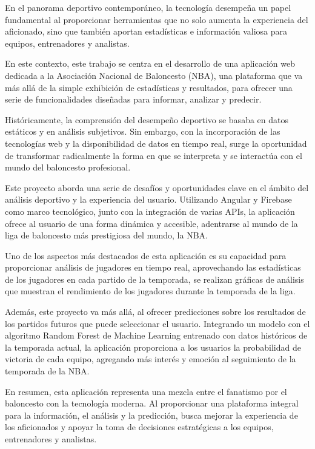 
En el panorama deportivo contemporáneo, la tecnología desempeña un papel fundamental al proporcionar herramientas que no solo aumenta la experiencia del aficionado, sino que también aportan estadísticas e información valiosa para equipos, entrenadores y analistas.

En este contexto, este trabajo se centra en el desarrollo de una aplicación web dedicada a la Asociación Nacional de Baloncesto (NBA), una plataforma que va más allá de la simple exhibición de estadísticas y resultados, para ofrecer una serie de funcionalidades diseñadas para informar, analizar y predecir. 

\vfill

Históricamente, la comprensión del desempeño deportivo se basaba en datos estáticos y en análisis subjetivos. Sin embargo, con la incorporación de las tecnologías web y la disponibilidad de datos en tiempo real, surge la oportunidad de transformar radicalmente la forma en que se interpreta y se interactúa con el mundo del baloncesto profesional. 

Este proyecto aborda una serie de desafíos y oportunidades clave en el ámbito del análisis deportivo y la experiencia del usuario. Utilizando Angular y Firebase como marco tecnológico, junto con la integración de varias APIs, la aplicación ofrece al usuario de una forma dinámica y accesible, adentrarse al mundo de la liga de baloncesto más prestigiosa del mundo, la NBA. 

\vfill

Uno de los aspectos más destacados de esta aplicación es su capacidad para proporcionar análisis de jugadores en tiempo real, aprovechando las estadísticas de los jugadores en cada partido de la temporada, se realizan gráficas de análisis que muestran el rendimiento de los jugadores durante la temporada de la liga.

Además, este proyecto va más allá, al ofrecer predicciones sobre los resultados de los partidos futuros que puede seleccionar el usuario. Integrando un modelo con el algoritmo Random Forest de Machine Learning entrenado con datos históricos de la temporada actual, la aplicación proporciona a los usuarios la probabilidad de victoria de cada equipo, agregando más interés y emoción al seguimiento de la temporada de la NBA.

\hfill

En resumen, esta aplicación representa una mezcla entre el fanatismo por el baloncesto con la tecnología moderna. Al proporcionar una plataforma integral para la información, el análisis y la predicción, busca mejorar la experiencia de los aficionados y apoyar la toma de decisiones estratégicas a los equipos, entrenadores y analistas.

